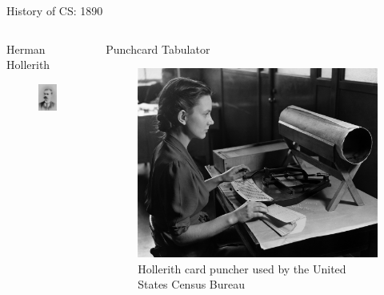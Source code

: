 \documentclass[xcolor={dvipsnames}]{beamer}
\begin{document}
\begin{frame}{History of CS: 1890}
	\begin{columns}
	 \begin{column}{.49\textwidth}
			\begin{center}Herman Hollerith\end{center}
  			\begin{figure}
 				\includegraphics[scale=.50]{Hollerith}
			\end{figure}
 	\end{column}
	 \begin{column}{.49\textwidth}
		\begin{center}Punchcard Tabulator\end{center}
  		\begin{figure}
 		\includegraphics[scale=0.20]{Card_puncher_NARA_513295}
		\caption{Hollerith card puncher used by the United States Census Bureau}
		\end{figure}
	\end{column}
\end{columns}
\end{frame}
\end{document}
